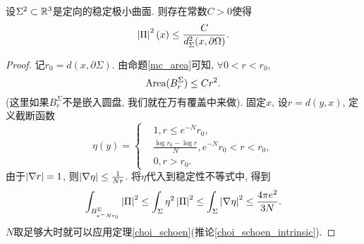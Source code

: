 \begin{theorem}
    设$\Sigma^2 \subset \mathbb{R}^3$是定向的稳定极小曲面. 则存在常数$C>0$使得
    \begin{equation}
        \left | {\Pi} \right |^2(x) \le \frac{C}{d^2_\Sigma(x,\partial \Omega)}.
    \end{equation}
\end{theorem}
\begin{proof}
    记$r_0=d(x,\partial \Sigma)$. 由命题\eqref{mc_area}可知, $\forall 0<r < r_0$, 
    \begin{equation}
        \text{Area}(B^\Sigma_r) \le Cr^2.
    \end{equation}
    (这里如果$B^\Sigma_r$不是嵌入圆盘, 我们就在万有覆盖中来做). 固定$x$, 设$r=d(y,x)$, 定义截断函数
    \begin{equation}
        \eta(y)=\left\{
            \begin{aligned}
                & 1, r\le e^{-N}r_0, \\
                & \frac{\log r_0-\log r}{N}, e^{-N}r_0 < r < r_0, \\
                & 0, r>r_0.
            \end{aligned}
        \right.
    \end{equation}
    由于$\left | \nabla r \right |=1$, 则$\left | \nabla \eta \right | \le \frac{1}{Nr}$. 将$\eta$代入到稳定性不等式中, 得到
    \begin{equation}
        \int_{B^\Sigma_{e^-Nr_0}}\left | {\Pi} \right |^2 \le \int_\Sigma \eta^2 \left | {\Pi} \right |^2 \le \int_\Sigma \left | \nabla \eta \right |^2 \le \frac{4\pi e^2}{3N}.
    \end{equation}
    $N$取足够大时就可以应用定理\eqref{choi_schoen}(推论\eqref{choi_schoen_intrinsic}).
\end{proof}